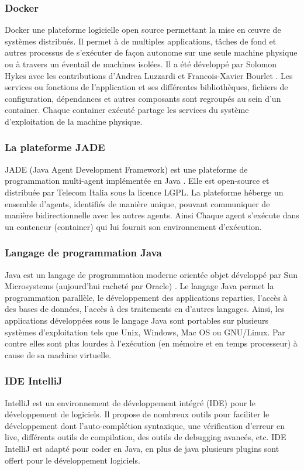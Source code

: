 \subsubsection*{Docker}
Docker une plateforme logicielle open source permettant la mise en œuvre de systèmes distribués. Il permet à de multiples applications, tâches de fond et autres processus de s'exécuter de façon autonome sur une seule machine physique ou à travers un éventail de machines isolées. Il a été développé par Solomon Hykes avec les contributions d'Andrea Luzzardi et Francois-Xavier Bourlet  \citep{docker}. Les services ou fonctions de l’application et ses différentes bibliothèques, fichiers de configuration, dépendances et autres composants sont regroupés au sein d'un container. Chaque container exécuté partage les services du système  d’exploitation de la machine physique.
\subsubsection*{La plateforme JADE}
JADE (Java Agent Development Framework) est une plateforme de programmation multi-agent implémentée en Java \citep{jade}. Elle est open-source et distribuée par Telecom Italia sous la licence LGPL. La plateforme héberge un ensemble d’agents, identifiés de manière unique, pouvant communiquer de manière bidirectionnelle avec les autres agents. Ainsi Chaque agent s’exécute dans un conteneur (container) qui lui fournit son environnement d’exécution.
\subsubsection*{Langage de programmation Java}
Java est un langage de programmation moderne orientée objet développé par Sun Microsystems (aujourd'hui racheté par Oracle) \cite{java}. Le langage Java permet la programmation parallèle, le développement des applications reparties, l'accès à des bases de données, l'accès à des traitements en d'autres langages. Ainsi, les applications développées sous le langage  Java sont portables sur plusieurs systèmes d’exploitation tels que Unix, Windows, Mac OS ou GNU/Linux. Par contre elles sont plus lourdes à l'exécution (en mémoire et en temps processeur) à cause de sa machine virtuelle.

\subsubsection*{IDE IntelliJ}
IntelliJ est un environnement de développement intégré (IDE) pour le développement de logiciels. Il propose de nombreux outils pour faciliter le développement dont  l'auto-complétion syntaxique, une vérification d'erreur en live, différents outils de compilation, des outils de debugging avancés, etc. IDE IntelliJ est adapté pour coder en Java, en plus de java plusieurs plugins sont offert pour le développement logiciels.
